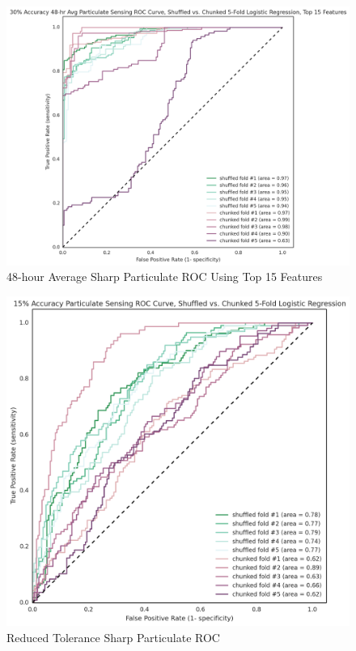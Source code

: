 \begin{figure}[htb]
 	\includegraphics[width=\textwidth]{figs/sharp_48_avg_goals_30_roc_pruned_features}               
 	 \caption{48-hour Average Sharp Particulate ROC Using Top 15 Features}
  	\label{fig:sharp_48_avg_goals_30_roc_pruned_features}
\end{figure}

\begin{figure}[htb]
 	\includegraphics[width=\textwidth]{figs/sharp_goals_15_roc}               
 	 \caption{Reduced Tolerance Sharp Particulate ROC}
  	\label{fig:sharp_goals_15_roc}
\end{figure}

